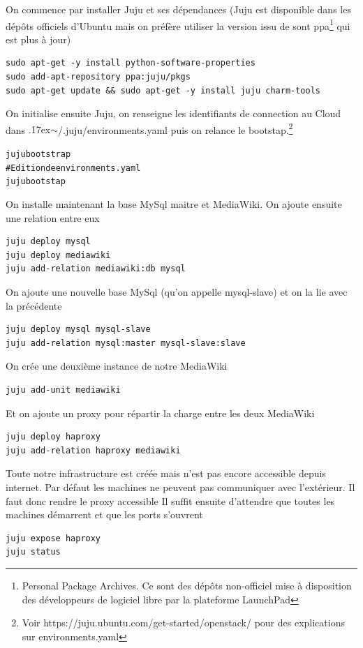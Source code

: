 \documentclass[a4paper,oneside]{report}
\begin{document}
On commence par installer Juju et ses dépendances (Juju est disponible dans les dépôts officiels d'Ubuntu mais on préfère utiliser la version issu de sont ppa\footnote{Personal Package Archives. Ce sont des dépôts non-officiel mise à disposition des développeurs de logiciel libre par la plateforme LaunchPad} qui est plus à jour)
\begin{verbatim}
sudo apt-get -y install python-software-properties
sudo add-apt-repository ppa:juju/pkgs
sudo apt-get update && sudo apt-get -y install juju charm-tools
\end{verbatim}

On initialise ensuite Juju, on renseigne les identifiants de connection au Cloud dans {\raise.17ex\hbox{$\scriptstyle\sim$}}/.juju/environments.yaml puis on relance le bootstap.\footnote{Voir https://juju.ubuntu.com/get-started/openstack/ pour des explications sur environments.yaml}
\begin{alltt}
juju bootstrap
# Edition de environments.yaml
juju bootstap
\end{alltt}

On installe maintenant la base MySql maitre et MediaWiki. On ajoute ensuite une relation entre eux
\begin{verbatim}
juju deploy mysql
juju deploy mediawiki
juju add-relation mediawiki:db mysql
\end{verbatim}

On ajoute une nouvelle base MySql (qu'on appelle mysql-slave) et on la lie avec la précédente
\begin{verbatim}
juju deploy mysql mysql-slave
juju add-relation mysql:master mysql-slave:slave
\end{verbatim}

On crée une deuxième instance de notre MediaWiki
\begin{verbatim}
juju add-unit mediawiki
\end{verbatim}


Et on ajoute un proxy pour répartir la charge entre les deux MediaWiki
\begin{verbatim}
juju deploy haproxy
juju add-relation haproxy mediawiki
\end{verbatim}

Toute notre infrastructure est créée mais n'est pas encore accessible depuis internet. 
Par défaut les machines ne peuvent pas communiquer avec l'extérieur. Il faut donc rendre le proxy accessible
Il suffit ensuite d'attendre que toutes les machines démarrent et que les ports s'ouvrent
\begin{verbatim}
juju expose haproxy
juju status
\end{verbatim}
\end{document}
